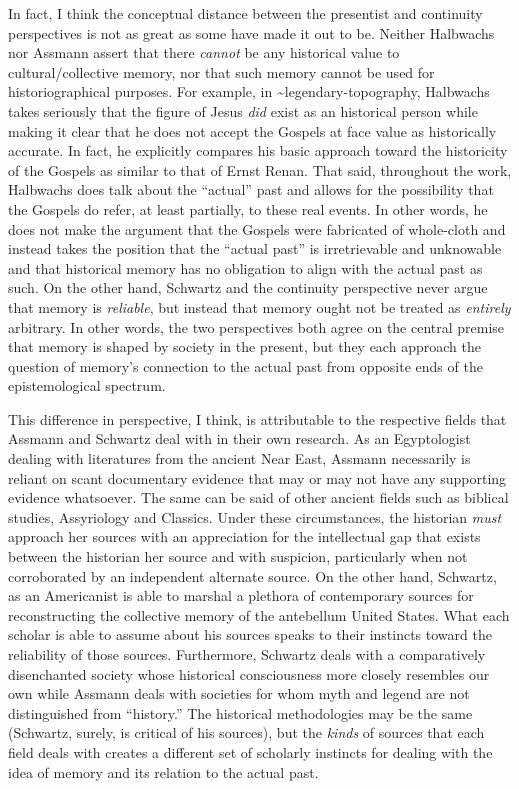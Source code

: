 In fact, I think the conceptual distance between the presentist and
continuity perspectives is not as great as some have made it out to be.
Neither Halbwachs nor Assmann assert that there \emph{cannot} be any
historical value to cultural/collective memory, nor that such memory
cannot be used for historiographical purposes. For example, in
\textasciitilde{}legendary-topography, Halbwachs takes seriously that
the figure of Jesus \emph{did} exist as an historical person while
making it clear that he does not accept the Gospels at face value as
historically accurate. In fact, he explicitly compares his basic
approach toward the historicity of the Gospels as similar to that of
Ernst Renan. That said, throughout the work, Halbwachs does talk about
the ``actual'' past and allows for the possibility that the Gospels do
refer, at least partially, to these real events. In other words, he does
not make the argument that the Gospels were fabricated of whole-cloth
and instead takes the position that the ``actual past'' is irretrievable
and unknowable and that historical memory has no obligation to align
with the actual past as such. On the other hand, Schwartz and the
continuity perspective never argue that memory is \emph{reliable}, but
instead that memory ought not be treated as \emph{entirely} arbitrary.
In other words, the two perspectives both agree on the central premise
that memory is shaped by society in the present, but they each approach
the question of memory's connection to the actual past from opposite
ends of the epistemological spectrum.

This difference in perspective, I think, is attributable to the
respective fields that Assmann and Schwartz deal with in their own
research. As an Egyptologist dealing with literatures from the ancient
Near East, Assmann necessarily is reliant on scant documentary evidence
that may or may not have any supporting evidence whatsoever. The same
can be said of other ancient fields such as biblical studies,
Assyriology and Classics. Under these circumstances, the historian
\emph{must} approach her sources with an appreciation for the
intellectual gap that exists between the historian her source and with
suspicion, particularly when not corroborated by an independent
alternate source. On the other hand, Schwartz, as an Americanist is able
to marshal a plethora of contemporary sources for reconstructing the
collective memory of the antebellum United States. What each scholar is
able to assume about his sources speaks to their instincts toward the
reliability of those sources. Furthermore, Schwartz deals with a
comparatively disenchanted society whose historical consciousness more
closely resembles our own while Assmann deals with societies for whom
myth and legend are not distinguished from ``history.'' The historical
methodologies may be the same (Schwartz, surely, is critical of his
sources), but the \emph{kinds} of sources that each field deals with
creates a different set of scholarly instincts for dealing with the idea
of memory and its relation to the actual past.

